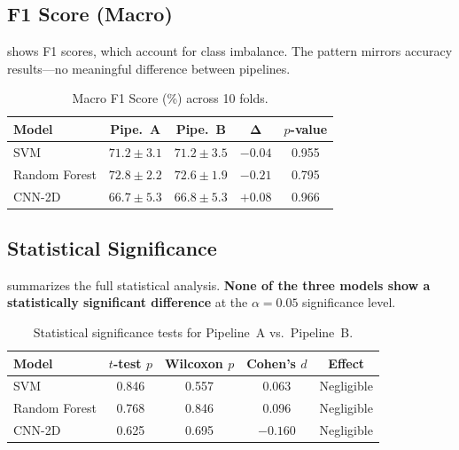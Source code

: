 \documentclass[conference]{IEEEtran}
\begin{document}
\subsection{F1 Score (Macro)}

 shows F1 scores, which account for class imbalance. The pattern mirrors accuracy results---no meaningful difference between pipelines.

\begin{table}[htbp]
\centering
\caption{Macro F1 Score (\%) across 10 folds.}
\label{tab:f1}
\begin{tabular}{@{}lcccc@{}}
\toprule
\textbf{Model} & \textbf{Pipe.\ A} & \textbf{Pipe.\ B} & $\boldsymbol{\Delta}$ & \textbf{$p$-value} \\
\midrule
SVM            & $71.2 \pm 3.1$ & $71.2 \pm 3.5$ & $-0.04$ & 0.955 \\
Random Forest  & $72.8 \pm 2.2$ & $72.6 \pm 1.9$ & $-0.21$ & 0.795 \\
CNN-2D         & $66.7 \pm 5.3$ & $66.8 \pm 5.3$ & $+0.08$ & 0.966 \\
\bottomrule
\end{tabular}
\end{table}

\subsection{Statistical Significance}

 summarizes the full statistical analysis. \textbf{None of the three models show a statistically significant difference} at the $\alpha = 0.05$ significance level.

\begin{table}[htbp]
\centering
\caption{Statistical significance tests for Pipeline~A vs.\ Pipeline~B.}
\label{tab:stats}
\begin{tabular}{@{}lcccc@{}}
\toprule
\textbf{Model} & \textbf{$t$-test $p$} & \textbf{Wilcoxon $p$} & \textbf{Cohen's $d$} & \textbf{Effect} \\
\midrule
SVM            & 0.846 & 0.557 & 0.063  & Negligible \\
Random Forest  & 0.768 & 0.846 & 0.096  & Negligible \\
CNN-2D         & 0.625 & 0.695 & $-0.160$ & Negligible \\
\bottomrule
\end{tabular}
\end{table}
\end{document}
